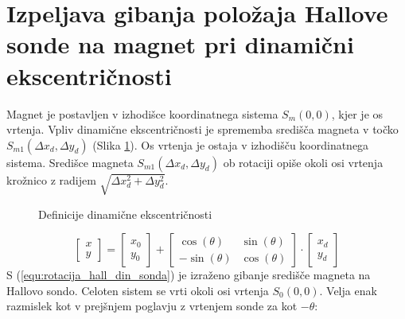 \section{Izpeljava gibanja položaja Hallove sonde na magnet pri dinamični ekscentričnosti}

Magnet je postavljen v izhodišce koordinatnega sistema $S_m(0,0)$, kjer je os vrtenja. Vpliv dinamične ekscentričnosti je sprememba središča magneta v točko $S_{m1}(\Delta x_d,\Delta y_d)$ (Slika \ref{fig:def_din_eks}). Os vrtenja je ostaja v izhodišču koordinatnega sistema. Središce magneta $S_{m1}(\Delta x_d,\Delta y_d)$ ob rotaciji opiše okoli osi vrtenja krožnico z radijem $\sqrt{\Delta x_d^2+\Delta y_d^2}$.

\begin{figure}[h!]
	\centering
	\caption{Definicije dinamične ekscentričnosti}
	\label{fig:def_din_eks}
\end{figure}

\begin{equation}
\label{equ:rotacija_hall_din_sonda}
\begin{bmatrix} x\\y \end{bmatrix}=
\begin{bmatrix} x_0\\y_0 \end{bmatrix}+
\begin{bmatrix} \cos(\theta)&\sin(\theta)\\-\sin(\theta)&\cos(\theta) \end{bmatrix}\cdot
\begin{bmatrix} x_d\\y_d \end{bmatrix}
\end{equation}
S (\ref{equ:rotacija_hall_din_sonda}) je izraženo gibanje središče magneta na Hallovo sondo. Celoten sistem se vrti okoli osi vrtenja $S_0(0,0)$. Velja enak razmislek kot v prejšnjem poglavju z vrtenjem sonde za kot  $-\theta$:
 
